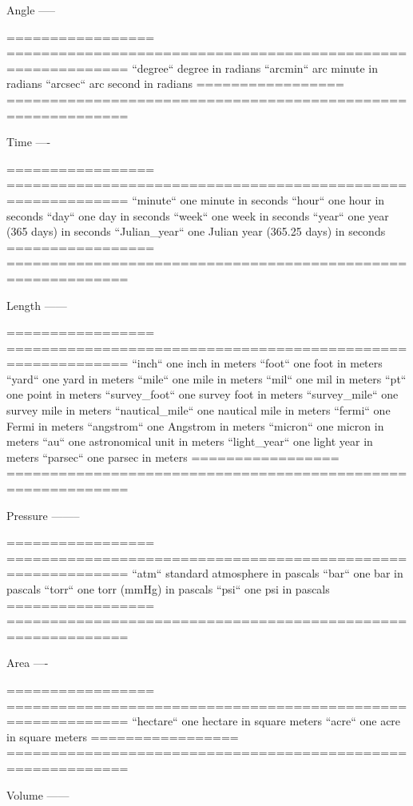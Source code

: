 \begin{DoxyVerb}
Angle
-----

=================  ============================================================
``degree``         degree in radians
``arcmin``         arc minute in radians
``arcsec``         arc second in radians
=================  ============================================================


Time
----

=================  ============================================================
``minute``         one minute in seconds
``hour``           one hour in seconds
``day``            one day in seconds
``week``           one week in seconds
``year``           one year (365 days) in seconds
``Julian_year``    one Julian year (365.25 days) in seconds
=================  ============================================================


Length
------

=================  ============================================================
``inch``           one inch in meters
``foot``           one foot in meters
``yard``           one yard in meters
``mile``           one mile in meters
``mil``            one mil in meters
``pt``             one point in meters
``survey_foot``    one survey foot in meters
``survey_mile``    one survey mile in meters
``nautical_mile``  one nautical mile in meters
``fermi``          one Fermi in meters
``angstrom``       one Angstrom in meters
``micron``         one micron in meters
``au``             one astronomical unit in meters
``light_year``     one light year in meters
``parsec``         one parsec in meters
=================  ============================================================

Pressure
--------

=================  ============================================================
``atm``            standard atmosphere in pascals
``bar``            one bar in pascals
``torr``           one torr (mmHg) in pascals
``psi``            one psi in pascals
=================  ============================================================

Area
----

=================  ============================================================
``hectare``        one hectare in square meters
``acre``           one acre in square meters
=================  ============================================================


Volume
------


\end{DoxyVerb}

